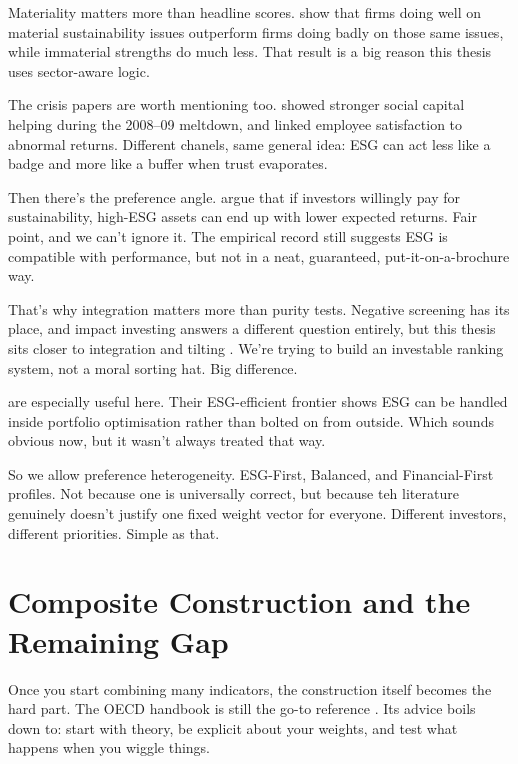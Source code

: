 Materiality matters more than headline scores. \textcite{khan_serafeim_yoon_2016} show that firms doing well on material sustainability issues outperform firms doing badly on those same issues, while immaterial strengths do much less. That result is a big reason this thesis uses sector-aware logic.

The crisis papers are worth mentioning too. \textcite{lins_servaes_tamayo_2017} showed stronger social capital helping during the 2008--09 meltdown, and \textcite{edmans_2011} linked employee satisfaction to abnormal returns. Different chanels, same general idea: ESG can act less like a badge and more like a buffer when trust evaporates.

Then there's the preference angle. \textcite{pastor_stambaugh_taylor_2021} argue that if investors willingly pay for sustainability, high-ESG assets can end up with lower expected returns. Fair point, and we can't ignore it. The empirical record still suggests ESG is compatible with performance, but not in a neat, guaranteed, put-it-on-a-brochure way.

That's why integration matters more than purity tests. Negative screening has its place, and impact investing answers a different question entirely, but this thesis sits closer to integration and tilting \cite{hong_kacperczyk_2009, brest_born_2013}. We're trying to build an investable ranking system, not a moral sorting hat. Big difference.

\textcite{pedersen_fitzgibbons_pomorski_2021} are especially useful here. Their ESG-efficient frontier shows ESG can be handled inside portfolio optimisation rather than bolted on from outside. Which sounds obvious now, but it wasn't always treated that way.

So we allow preference heterogeneity. ESG-First, Balanced, and Financial-First profiles. Not because one is universally correct, but because teh literature genuinely doesn't justify one fixed weight vector for everyone. Different investors, different priorities. Simple as that.

\section{Composite Construction and the Remaining Gap}
\label{sec:lit_composite_gaps}

Once you start combining many indicators, the construction itself becomes the hard part. The OECD handbook is still the go-to reference \cite{oecd_2008}. Its advice boils down to: start with theory, be explicit about your weights, and test what happens when you wiggle things.

